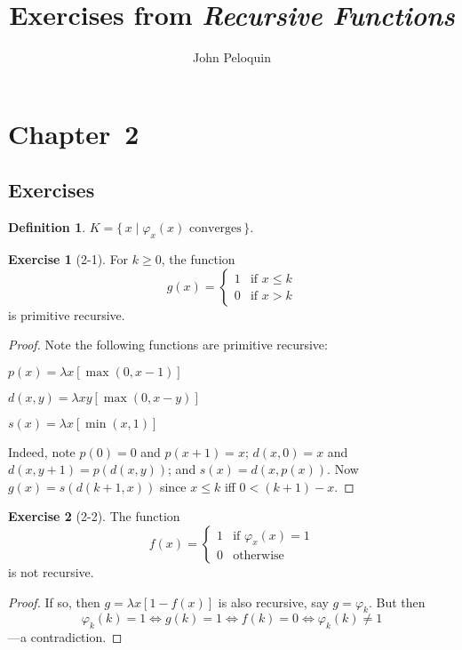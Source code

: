 \documentclass[letterpaper]{article}
\title{Exercises from \emph{Recursive Functions}}
\author{John Peloquin}
\date{}
\theoremstyle{definition}
\newtheorem*{defn}{Definition}
\newtheorem*{exer}{Exercise}
\theoremstyle{remark}
\theoremstyle{direction}
\begin{document}
\maketitle

\section*{Chapter~2}

\subsection*{Exercises}
\begin{defn}
$K=\{\,x\mid\varphi_x(x)\text{ converges}\,\}$.
\end{defn}

\begin{exer}[2-1]
For $k\ge0$, the function
$$g(x)=
\begin{cases}
1&\text{if }x\le k\\
0&\text{if }x>k
\end{cases}$$
is primitive recursive.
\end{exer}
\begin{proof}
Note the following functions are primitive recursive:
\begin{description}[itemsep=0pt]
\item[Predecessor (truncated)] $p(x)=\lambda x[\max(0,x-1)]$
\item[Difference (truncated)] $d(x,y)=\lambda xy[\max(0,x-y)]$
\item[Signal] $s(x)=\lambda x[\min(x,1)]$
\end{description}
Indeed, note $p(0)=0$ and $p(x+1)=x$; $d(x,0)=x$ and $d(x,y+1)=p(d(x,y))$; and $s(x)=d(x,p(x))$. Now $g(x)=s(d(k+1,x))$ since $x\le k$ iff $0<(k+1)-x$.
\end{proof}

\begin{exer}[2-2]
The function
$$f(x)=
\begin{cases}
1&\text{if }\varphi_x(x)=1\\
0&\text{otherwise}
\end{cases}$$
is not recursive.
\end{exer}
\begin{proof}
If so, then $g=\lambda x[1-f(x)]$ is also recursive, say $g=\varphi_k$. But then
$$\varphi_k(k)=1\iff g(k)=1\iff f(k)=0\iff\varphi_k(k)\ne 1$$
---a contradiction.
\end{proof}
\end{document}

